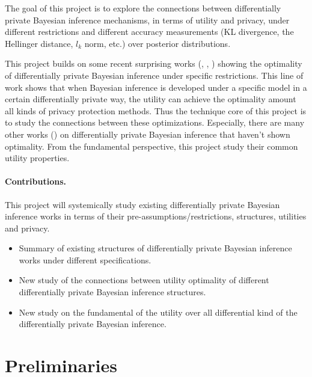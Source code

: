 \documentclass{article}
\begin{document}
The goal of this project is to explore the connections between differentially private Bayesian
inference mechanisms, in terms of utility and privacy, under different restrictions and different accuracy measurements (KL divergence, the Hellinger
distance, $l_k$ norm, etc.) over posterior distributions.
%
%

This project builds on some recent surprising works (\cite{ghosh2012universally}, \cite{zhang2016differential}, \cite{bernstein2020noise}) showing the optimality of differentially private Bayesian inference under specific restrictions. This line of work shows that when Bayesian inference is developed under a specific model in a certain differentially private way, the utility can achieve the optimality amount all kinds of privacy protection methods.
Thus the technique core of this project is to study the connections between these optimizations. 
Especially, there are many other works (\cite{bernstein2019differentially}) on differentially private Bayesian inference that haven't shown optimality.   
From the fundamental perspective, this project study their common utility properties.
%
\paragraph{Contributions.}
This project will systemically study existing differentially private Bayesian inference works in terms of their pre-assumptions/restrictions, structures, utilities and privacy.

\begin{itemize}
	\item Summary of existing structures of differentially private Bayesian inference works under different specifications.
%
	\item New study of the connections between utility optimality of different differentially private Bayesian inference structures. 
%	
	\item New study on the fundamental of the utility over all differential kind of the differentially private Bayesian inference.
%
\end{itemize}

\section{Preliminaries}
\end{document}
